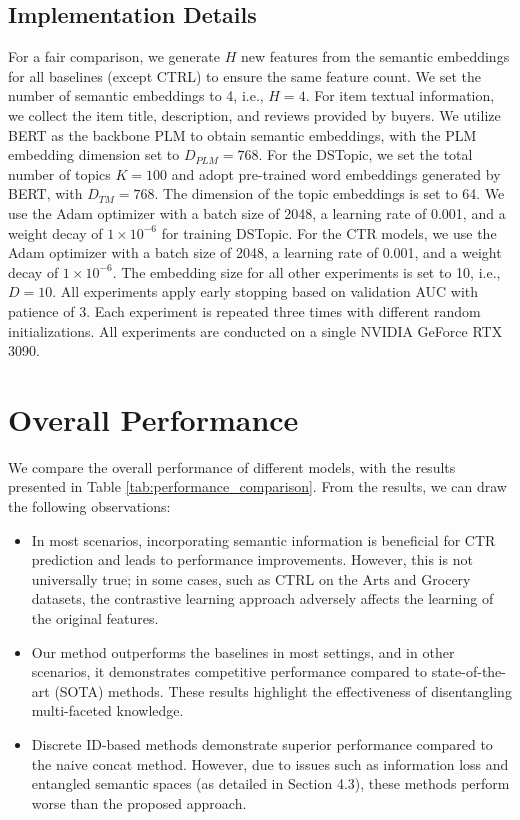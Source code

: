 \subsection{Implementation Details}
For a fair comparison, we generate \( H \) new features from the semantic embeddings for all baselines (except CTRL) to ensure the same feature count. We set the number of semantic embeddings to 4, i.e., \( H = 4 \). For item textual information, we collect the item title, description, and reviews provided by buyers. We utilize BERT \cite{BERT} as the backbone PLM to obtain semantic embeddings, with the PLM embedding dimension set to \( D_{PLM} = 768 \). For the DSTopic, we set the total number of topics \( K = 100 \) and adopt pre-trained word embeddings generated by BERT, with \( D_{TM} = 768 \). The dimension of the topic embeddings is set to 64. We use the Adam optimizer with a batch size of 2048, a learning rate of 0.001, and a weight decay of \( 1 \times 10^{-6} \) for training DSTopic. For the CTR models, we use the Adam optimizer with a batch size of 2048, a learning rate of 0.001, and a weight decay of \( 1 \times 10^{-6} \). The embedding size for all other experiments is set to 10, i.e., \( D = 10 \). All experiments apply early stopping based on validation AUC with patience of 3. Each experiment is repeated three times with different random initializations. All experiments are conducted on a single NVIDIA GeForce RTX 3090.


\section{Overall Performance}



We compare the overall performance of different models, with the results presented in Table \ref{tab:performance_comparison}. From the results, we can draw the following observations:
\begin{itemize}
    \item In most scenarios, incorporating semantic information is beneficial for CTR prediction and leads to performance improvements. However, this is not universally true; in some cases, such as CTRL on the Arts and Grocery datasets, the contrastive learning approach adversely affects the learning of the original features.
    \item Our method outperforms the baselines in most settings, and in other scenarios, it demonstrates competitive performance compared to state-of-the-art (SOTA) methods. These results highlight the effectiveness of disentangling multi-faceted knowledge.
    \item Discrete ID-based methods demonstrate superior performance compared to the naive concat method. However, due to issues such as information loss \cite{MOC} and entangled semantic spaces (as detailed in Section 4.3), these methods perform worse than the proposed approach.
\end{itemize}


